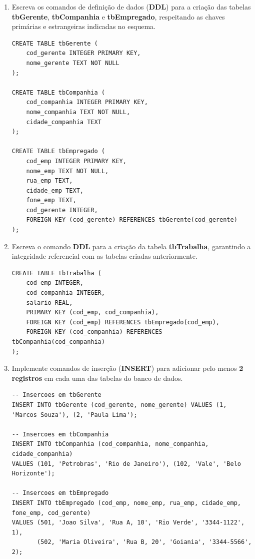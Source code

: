 \documentclass[12pt,a4paper]{article}
\begin{document}
\begin{enumerate}
    \item Escreva os comandos de definição de dados (\textbf{DDL}) para a criação das tabelas \textbf{tbGerente}, \textbf{tbCompanhia} e \textbf{tbEmpregado}, respeitando as chaves primárias e estrangeiras indicadas no esquema.\\
\begin{lstlisting}
CREATE TABLE tbGerente (
    cod_gerente INTEGER PRIMARY KEY,
    nome_gerente TEXT NOT NULL
);

CREATE TABLE tbCompanhia (
    cod_companhia INTEGER PRIMARY KEY,
    nome_companhia TEXT NOT NULL,
    cidade_companhia TEXT
);

CREATE TABLE tbEmpregado (
    cod_emp INTEGER PRIMARY KEY,
    nome_emp TEXT NOT NULL,
    rua_emp TEXT,
    cidade_emp TEXT,
    fone_emp TEXT,
    cod_gerente INTEGER,
    FOREIGN KEY (cod_gerente) REFERENCES tbGerente(cod_gerente)
);
\end{lstlisting}

    \item Escreva o comando \textbf{DDL} para a criação da tabela \textbf{tbTrabalha}, garantindo a integridade referencial com as tabelas criadas anteriormente.\\
\begin{lstlisting}
CREATE TABLE tbTrabalha (
    cod_emp INTEGER,
    cod_companhia INTEGER,
    salario REAL,
    PRIMARY KEY (cod_emp, cod_companhia),
    FOREIGN KEY (cod_emp) REFERENCES tbEmpregado(cod_emp),
    FOREIGN KEY (cod_companhia) REFERENCES tbCompanhia(cod_companhia)
);
\end{lstlisting}

    \item Implemente comandos de inserção (\textbf{INSERT}) para adicionar pelo menos \textbf{2 registros} em cada uma das tabelas do banco de dados.\\
\begin{lstlisting}
-- Insercoes em tbGerente
INSERT INTO tbGerente (cod_gerente, nome_gerente) VALUES (1, 'Marcos Souza'), (2, 'Paula Lima');

-- Insercoes em tbCompanhia
INSERT INTO tbCompanhia (cod_companhia, nome_companhia, cidade_companhia) 
VALUES (101, 'Petrobras', 'Rio de Janeiro'), (102, 'Vale', 'Belo Horizonte');

-- Insercoes em tbEmpregado
INSERT INTO tbEmpregado (cod_emp, nome_emp, rua_emp, cidade_emp, fone_emp, cod_gerente)
VALUES (501, 'Joao Silva', 'Rua A, 10', 'Rio Verde', '3344-1122', 1),
       (502, 'Maria Oliveira', 'Rua B, 20', 'Goiania', '3344-5566', 2);


\end{lstlisting}
\end{enumerate}
\end{document}
